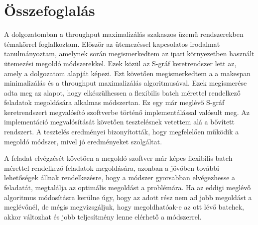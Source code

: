 \chapter{Összefoglalás}
A dolgozatomban a throughput maximalizálás szakaszos üzemű rendszerekben témakörrel foglalkoztam. Először az ütemezéssel kapcsolatos irodalmat tanulmányoztam, amelynek során megismerkedtem az ipari környezetben használt ütemezési megoldó módszerekkel. Ezek közül az S-gráf keretrendszer lett az, amely a dolgozatom alapját képezi. Ezt követően megismerkedtem a a makespan minimalizálás és a throughput maximalizálás algoritmusával. Ezek megismerése adta meg az alapot, hogy elkészülhessen a flexibilis batch mérettel rendelkező feladatok megoldására alkalmas módszertan. Ez egy már meglévő S-gráf keretrendszert megvalósító szoftverbe történő implementálással valósult meg. Az implementáció megvalósítását követően tesztelésnek vetettem alá a bővített rendszert. A tesztelés eredményei bizonyították, hogy megfelelően működik a megoldó módszer, mivel jó eredményeket szolgáltat.

A feladat elvégzését követően a megoldó szoftver már képes flexibilis batch mérettel rendelkező feladatok megoldására, azonban a jövőben további lehetőségek állnak rendelkezésre, hogy a módszer gyorsabban elvégezhesse a feladatát, megtalálja az optimális megoldást a problémára. Ha az eddigi meglévő algoritmus módosításra kerülne úgy, hogy az adott rész nem ad jobb megoldást a meglévőnél, de mégis megvizsgáljuk, hogy megoldhatóak-e az ott lévő batchek, akkor változhat és jobb teljesítmény lenne elérhető a módszerrel.